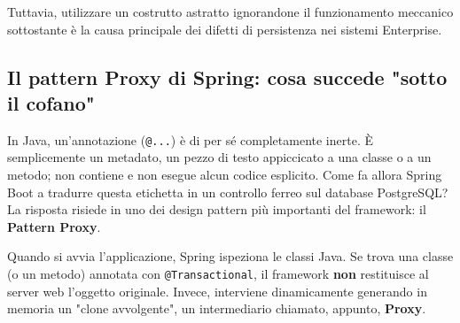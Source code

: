 Tuttavia, utilizzare un costrutto astratto ignorandone il funzionamento meccanico sottostante è la causa principale dei difetti di persistenza nei sistemi Enterprise.

\subsection{Il pattern Proxy di Spring: cosa succede "sotto il cofano"}

In Java, un'annotazione (\texttt{@...}) è di per sé completamente inerte. È semplicemente un metadato, un pezzo di testo appiccicato a una classe o a un metodo; non contiene e non esegue alcun codice esplicito.
Come fa allora Spring Boot a tradurre questa etichetta in un controllo ferreo sul database PostgreSQL? La risposta risiede in uno dei design pattern più importanti del framework: il \textbf{Pattern Proxy}.

Quando si avvia l'applicazione, Spring ispeziona le classi Java. Se trova una classe (o un metodo) annotata con \texttt{@Transactional}, il framework \textbf{non} restituisce al server web l'oggetto originale. Invece, interviene dinamicamente generando in memoria un "clone avvolgente", un intermediario chiamato, appunto, \textbf{Proxy}.

